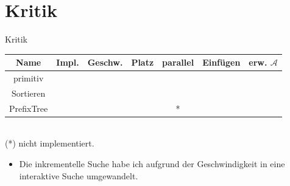 \documentclass[11pt, xcolor=dvipsnames]{beamer}
\begin{document}
	\section{Kritik}
	\begin{frame}{Kritik}
		\centering
		\begin{tabular}{c|cccccc}
			\textbf{Name}	&  Impl. & Geschw. & Platz & parallel & Einfügen & erw. $\mathcal{A}$ \\ 
			\hline
			primitiv	& \cellcolor{green} & \cellcolor{orange}  & \cellcolor{green}& \cellcolor{green} & \cellcolor{green} & \cellcolor{green} \\ 
			Sortieren	& \cellcolor{yellow} & \cellcolor{green} & \cellcolor{yellow} & \cellcolor{yellow} & \cellcolor{yellow} & \cellcolor{green} \\
			PrefixTree & \cellcolor{orange}  & \cellcolor{red} & \cellcolor{red} &\cellcolor{orange} * & \cellcolor{green} & \cellcolor{yellow}
		\end{tabular}\\
		(*) nicht implementiert. 
		
		\begin{itemize}
			\item Die inkrementelle Suche habe ich aufgrund der Geschwindigkeit in eine interaktive Suche umgewandelt.
		\end{itemize}
	\end{frame}
\end{document}
